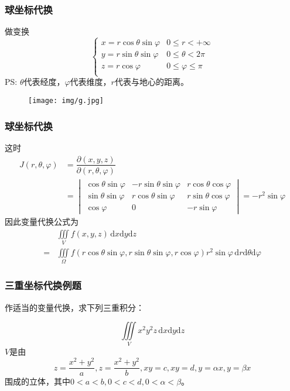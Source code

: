 \documentclass[xetex]{beamer}
\begin{document}
\begin{frame}
    \frametitle{球坐标代换}
    做变换
    $$\begin{cases}
        x = r \cos{\theta} \sin{\varphi} & 0 \leq r < + \infty \\
        y = r \sin{\theta} \sin{\varphi} & 0 \leq \theta < 2 \pi \\
        z = r \cos{\varphi} & 0 \leq \varphi \leq \pi \\
    \end{cases}$$
    PS: $\theta$代表经度，$\varphi$代表维度，$r$代表与地心的距离。\\
    \begin{figure}[ht]
        \centering %
       \texttt{[image: img/g.jpg]}
    \end{figure}
\end{frame} 

\begin{frame}
    \frametitle{球坐标代换}
    这时
    \begin{align*}
         J(r , \theta , \varphi) &= \dfrac {\partial (x,y,z)} {\partial (r, \theta , \varphi)} \\
         &=
         \begin{vmatrix}
             \cos{\theta} \sin{\varphi} & -r \sin{\theta} \sin{\varphi} & r \cos{\theta} \cos{\varphi} \\
             \sin{\theta} \sin{\varphi} & r \cos{\theta} \sin{\varphi} & r \sin{\theta} \cos{\varphi} \\
             \cos{\varphi} & 0 & -r \sin{\varphi} 
         \end{vmatrix} = - r^2 \sin{\varphi}
    \end{align*} 
     因此变量代换公式为
    \begin{align*}
        &\iiint \limits_V f(x,y,z) \,\mathrm{d}x\mathrm{d}y\mathrm{d}z \\
        =  &\iiint \limits_{\Omega} f(r \cos{\theta} \sin{\varphi} , r \sin{\theta} \sin{\varphi} , r \cos{\varphi}) r^2        \sin{\varphi} \,\mathrm{d}r\mathrm{d} \theta \mathrm{d} \varphi
    \end{align*}
\end{frame} 

\begin{frame}
    \frametitle{三重坐标代换例题}
    作适当的变量代换，求下列三重积分：

    $$\iiint\limits_Vx^2y^2z\,\mathrm{d}x\mathrm{d}y\mathrm{d}z$$
    $V$是由$$\displaystyle z=\frac{x^2+y^2}{a},z=\frac{x^2+y^2}{b},xy=c,xy=d,y=\alpha x,y=\beta x$$围成的立体，其中$0<a<b,0<c<d,0<\alpha<\beta$。
\end{frame} 
\end{document}
